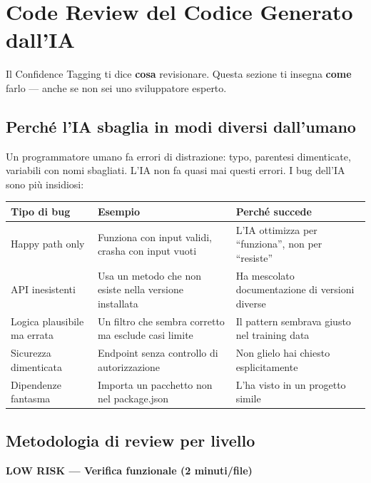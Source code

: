 \section{Code Review del Codice Generato dall'IA}

Il Confidence Tagging ti dice \textbf{cosa} revisionare. Questa sezione ti insegna \textbf{come} farlo --- anche se non sei uno sviluppatore esperto.

\subsection{Perché l'IA sbaglia in modi diversi dall'umano}

Un programmatore umano fa errori di distrazione: typo, parentesi dimenticate, variabili con nomi sbagliati. L'IA non fa quasi mai questi errori. I bug dell'IA sono più insidiosi:

\begin{center}
\begin{small}
\begin{tabularx}{\textwidth}{l l X}
\toprule
\textbf{Tipo di bug} & \textbf{Esempio} & \textbf{Perché succede} \\
\midrule
Happy path only & Funziona con input validi, crasha con input vuoti & L'IA ottimizza per ``funziona'', non per ``resiste'' \\
API inesistenti & Usa un metodo che non esiste nella versione installata & Ha mescolato documentazione di versioni diverse \\
Logica plausibile ma errata & Un filtro che sembra corretto ma esclude casi limite & Il pattern sembrava giusto nel training data \\
Sicurezza dimenticata & Endpoint senza controllo di autorizzazione & Non glielo hai chiesto esplicitamente \\
Dipendenze fantasma & Importa un pacchetto non nel package.json & L'ha visto in un progetto simile \\
\bottomrule
\end{tabularx}
\end{small}
\end{center}

\subsection{Metodologia di review per livello}

\textbf{\textcolor{green!60!black}{LOW RISK} --- Verifica funzionale (2 minuti/file)}

